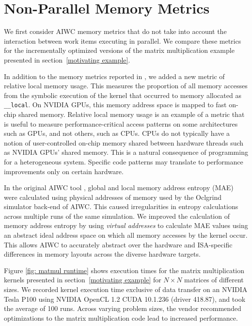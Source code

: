 \documentclass[review=false, sigchi]{acmart}
\begin{document}
	\section{Non-Parallel Memory Metrics} \label{method}
	
	We first consider AIWC memory metrics that do not take into account the interaction between work items executing in parallel.
	We compare these metrics for the incrementally optimized versions of the matrix multiplication example presented in section~\ref{motivating example}.
	
	In addition to the memory metrics reported in \cite{beauaiwc}, we added a new metric of relative local memory usage.
	This measures the proportion of all memory accesses from the symbolic execution of the kernel that occurred to memory allocated as \texttt{\_\_local}.
	On NVIDIA GPUs, this memory address space is mapped to fast on-chip shared memory.
	Relative local memory usage is an example of a metric that is useful to measure performance-critical access patterns on some architectures such as GPUs, and not others, such as CPUs.
	CPUs do not typically have a notion of user-controlled on-chip memory shared between hardware threads such as NVIDIA GPUs' shared memory.
	This is a natural consequence of programming for a heterogeneous system. Specific code patterns may translate to performance improvements only on certain hardware.
	
	In the original AIWC tool \cite{beau_johnston_2017_1134175}, global and local memory address entropy (MAE) were calculated using physical addresses of memory used by the Oclgrind simulator back-end of AIWC. This caused irregularities in entropy calculations across multiple runs of the same simulation. We improved the calculation of memory address entropy by using \textit{virtual addresses} to calculate MAE values using an abstract ideal address space on which all memory accesses by the kernel occur. This allows AIWC to accurately abstract over the hardware and ISA-specific differences in memory layouts across the diverse hardware targets.

	Figure \ref{fig: matmul runtime} shows execution times for the matrix multiplication kernels presented in section~\ref{motivating example} for $N \times N$ matrices of different sizes.
	We recorded kernel execution time exclusive of data transfer on an NVIDIA Tesla P100 using NVIDIA OpenCL 1.2 CUDA 10.1.236 (driver 418.87), and took the average of 100 runs.
	Across varying problem sizes, the vendor recommended optimizations to the matrix multiplication code lead to increased performance. 
\end{document}
